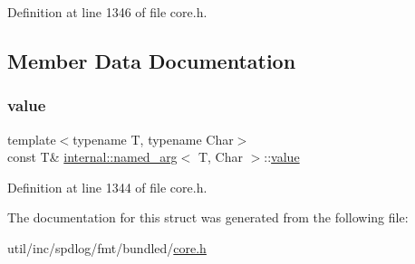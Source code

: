 Definition at line 1346 of file core.\+h.



\subsection{Member Data Documentation}
\mbox{\label{structinternal_1_1named__arg_aa97a74474c2c98dbcb5dbad098b6673b}} 
\subsubsection{\texorpdfstring{value}{value}}
{\footnotesize\ttfamily template$<$typename T, typename Char$>$ \\
const T\& \hyperlink{structinternal_1_1named__arg}{internal\+::named\+\_\+arg}$<$ T, Char $>$\+::\hyperlink{classinternal_1_1value}{value}}



Definition at line 1344 of file core.\+h.



The documentation for this struct was generated from the following file\+:\begin{DoxyCompactItemize}
\item 
util/inc/spdlog/fmt/bundled/\hyperlink{core_8h}{core.\+h}\end{DoxyCompactItemize}
